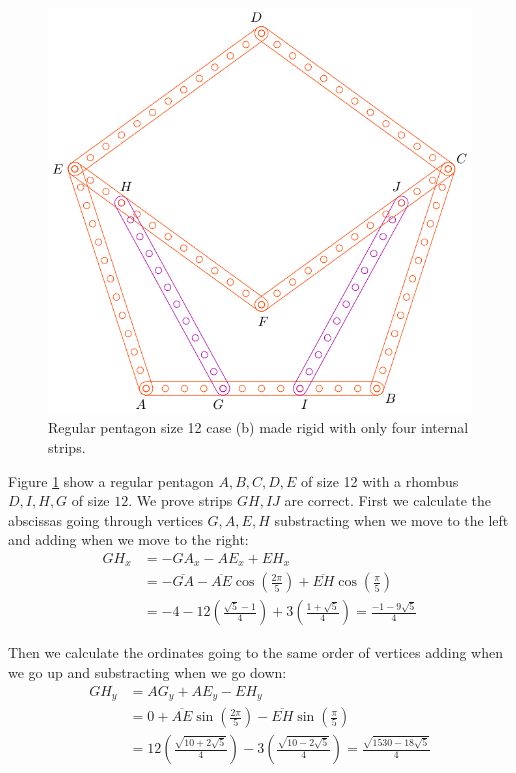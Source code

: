 \documentclass[11pt]{article}
\begin{document}
\begin{figure}[h]
 \centering
 \includegraphics[scale=1]{12/penta12b}
 \caption{Regular pentagon size 12 case (b) made rigid with only four internal strips.}
 \label{fig:penta12b}
\end{figure}

Figure \ref{fig:penta12b} show a regular pentagon $A,B,C,D,E$ of size 12 with a rhombus $D,I,H,G$ of size $12$. We prove strips $GH,IJ$ are correct. First we calculate the abscissas going through vertices $G,A,E,H$ substracting when we move to the left and adding when we move to the right:
\begin{align}
GH_x &= -GA_x - AE_x + EH_x\nonumber\\
 &= -\overline{GA} - \overline{AE}\cos\left(\frac{2\pi}5\right)
 +\overline{EH}\cos\left(\frac{\pi}5\right)\nonumber\\
 &= -4 - 12\left(\frac{\sqrt5 - 1}4\right) + 3\left(\frac{1+\sqrt5}4\right)
 = \frac{-1-9\sqrt5}4
\end{align}

Then we calculate the ordinates going to the same order of vertices adding when we go up and substracting when we go down:
\begin{align}
GH_y &= AG_y + AE_y - EH_y\nonumber\\
 &= 0 + \overline{AE}\sin\left(\frac{2\pi}5\right)
 - \overline{EH}\sin\left(\frac{\pi}5\right)\nonumber\\
 &= 12\left(\frac{\sqrt{10+2\sqrt5}}4\right)
 - 3\left(\frac{\sqrt{10-2\sqrt5}}4\right)%
 = \frac{\sqrt{1530-18\sqrt5}}4
\end{align}
\end{document}
